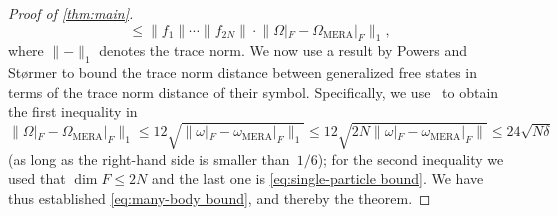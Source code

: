 \documentclass[aps,pra,reprint,superscriptaddress,floatfix,amsmath,amssymb,amsfonts]{revtex4-1}
\begin{document}
\begin{proof}[Proof of \cref{thm:main}]
\[%
\leq \lVert f_1 \rVert \cdots \lVert f_{2N} \rVert \cdot \lVert \Omega|_F - \Omega_{\text{MERA}}|_F \rVert_1, \]
where $\lVert-\rVert_1$ denotes the trace norm.
We now use a result by Powers and St\o{}rmer to bound the trace norm distance between generalized free states in terms of the trace norm distance of their symbol.
Specifically, we use~\cite[Lemmas~4.1 and 4.6]{powers1970free} to obtain the first inequality in
\[ \lVert \Omega|_F - \Omega_{\text{MERA}}|_F \rVert_1
\leq 12 \sqrt{\lVert \omega|_F - \omega_{\text{MERA}}|_F \rVert_1}
\leq 12 \sqrt{2N \lVert \omega|_F - \omega_{\text{MERA}}|_F \rVert}
\leq 24 \sqrt{N \delta} \]
(as long as the right-hand side is smaller than~$1/6$); for the second inequality we used that $\dim F\leq2N$ and the last one is \cref{eq:single-particle bound}.
We have thus established \cref{eq:many-body bound}, and thereby the theorem.
\end{proof}
\end{document}
